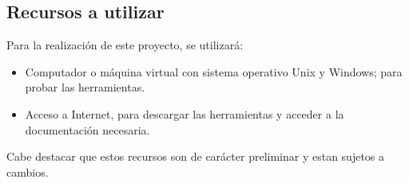 \subsection{Recursos a utilizar}

Para la realización de este proyecto, se utilizará:
\begin{itemize}
 \item Computador o máquina virtual con sistema operativo Unix y Windows; para probar las herramientas.
 \item Acceso a Internet, para descargar las herramientas y acceder a la documentación necesaria.
\end{itemize}

Cabe destacar que estos recursos son de carácter preliminar y estan sujetos a cambios.
